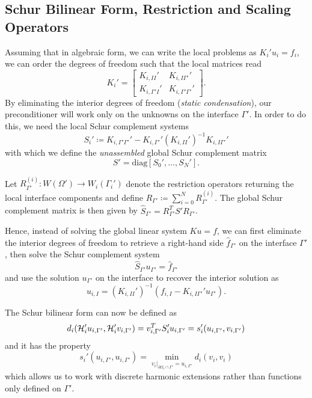\subsection{Schur Bilinear Form, Restriction and Scaling Operators}

Assuming that in algebraic form, we can write the local problems as $K_i'u_i = f_i$, we can order the degrees of freedom such that the local matrices read
\begin{equation}
    \label{local-matrix}
    K_i' = \begin{bmatrix} K_{i, II}' & K_{i, I\Gamma'}' \\ K_{i, \Gamma' I}' & K_{i, \Gamma' \Gamma'}' \end{bmatrix}.
\end{equation}
By eliminating the interior degrees of freedom (\textit{static condensation}), our preconditioner will work only on the unknowns on the interface $\Gamma'$. In order to do this, we need the local Schur complement systems
\[S_i' \coloneqq K_{i, \Gamma' \Gamma'}' - K_{i, \Gamma'}'(K_{i, II}')^{-1}K_{i, I \Gamma'}'\]
with which we define the \textit{unassembled} global Schur complement matrix \[S' = \text{diag}[S_0',\dots,S_N'].\] 

Let $R_{\Gamma'}^{(i)}: W(\Omega') \rightarrow W_i(\Gamma_i')$ denote the restriction operators returning the local interface components and define $R_{\Gamma'} \coloneqq \sum_{i = 0}^N R_{\Gamma'}^{(i)}$. The global Schur complement matrix is then given by $\widehat S_{\Gamma'} = R_{\Gamma'}^TS'R_{\Gamma'}$.

Hence, instead of solving the global linear system $Ku = f$, we can first eliminate the interior degrees of freedom to retrieve a right-hand side $\widehat f_{\Gamma'}$ on the interface $\Gamma'$, then solve the Schur complement system
\[\widehat S_{\Gamma'} u_{\Gamma'} = \widehat f_{\Gamma'}\]
and use the solution $u_{\Gamma'}$ on the interface to recover the interior solution as
\[u_{i,I} = (K_{i,II}')^{-1}(f_{i,I} - K_{i,I\Gamma'}'u_{\Gamma'}).\]

The Schur bilinear form can now be defined as 
\[d_i(\mathcal{H}_i'u_{i,\Gamma'},\mathcal{H}_i'v_{i,\Gamma'}) = v_{i,\Gamma'}^TS_i'u_{i,\Gamma'} = s_i'(u_{i,\Gamma'},v_{i,\Gamma'})\]
and it has the property
\begin{equation}
    \label{schur-min-property}
    s_i'(u_{i,\Gamma'},u_{i,\Gamma'}) = \min_{v_i|_{\partial \Omega_i \cap \Gamma'} = u_{i,\Gamma'}} d_i(v_i,v_i)
\end{equation}
which allows us to work with discrete harmonic extensions rather than functions only defined on $\Gamma'$.

